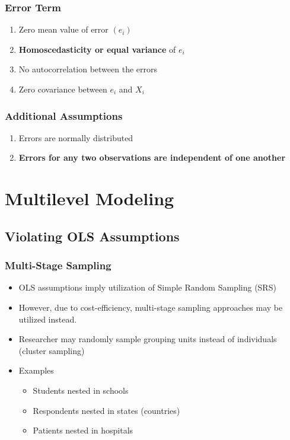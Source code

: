 \documentclass{beamer}
\begin{document}
\begin{frame}
	\frametitle{Error Term}
		\begin{enumerate}
			\item Zero mean value of error $(e_i)$
			\item \textbf{Homoscedasticity or equal variance} of $e_i$
			\item No autocorrelation between the errors
			\item Zero covariance between $e_i$ and $X_i$
		\end{enumerate}
\end{frame}

\begin{frame}
	\frametitle{Additional Assumptions}
		\begin{enumerate}
			\item Errors are normally distributed
			\item \textbf{Errors for any two observations are independent of one another}
		\end{enumerate}
\end{frame}

\section{Multilevel Modeling}

\subsection{Violating OLS Assumptions}

\begin{frame}
	\frametitle{Multi-Stage Sampling}
		\begin{itemize}
			\item OLS assumptions imply utilization of Simple Random Sampling (SRS)
			\item However, due to cost-efficiency, multi-stage sampling approaches may be utilized instead.
			\item Researcher may randomly sample grouping units instead of individuals (cluster sampling)
			\item Examples
				\begin{itemize}
					\item Students nested in schools
					\item Respondents nested in states (countries)
					\item Patients nested in hospitals
				\end{itemize}
		\end{itemize}
\end{frame}
\end{document}
